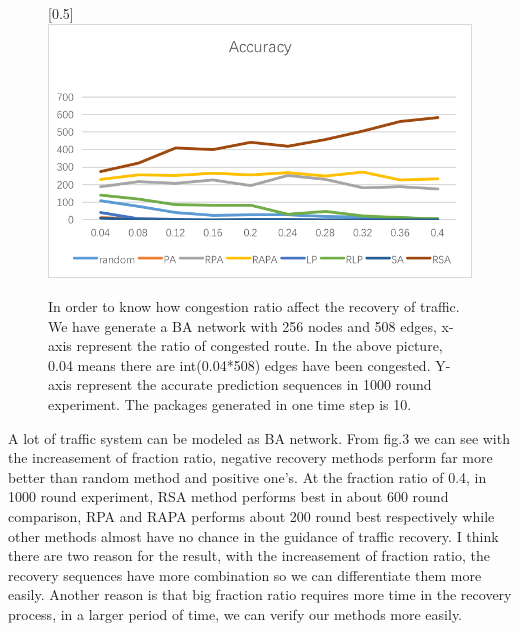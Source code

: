 \documentclass[onecolumn,preprintnumbers,amsmath,amssymb]{revtex4}
\begin{document}
\begin{figure}[ht]
\scalebox{0.5}[0.5]{\includegraphics[trim=0 10 0 0]{fractionSize.png}}
\caption{In order to know how congestion  ratio affect the recovery of traffic. We have generate a BA network with 256 nodes and 508 edges, x-axis represent the ratio of congested route. In the above picture, 0.04 means there are int(0.04*508) edges have been congested. Y-axis represent the accurate prediction sequences in 1000 round experiment. The packages generated in one time step is 10.}\label{BAZD}
\end{figure}


A lot of traffic system can be modeled as BA network. From fig.3 we can see with the increasement of fraction ratio, negative recovery methods perform far more better than random method and positive one's. At the fraction ratio of 0.4, in 1000 round experiment, RSA method performs best in about 600 round comparison, RPA and RAPA performs about 200 round best respectively while other methods almost have no chance in the guidance of traffic recovery. I think there are two reason for the result, with the increasement of fraction ratio, the recovery sequences have  more combination so we can differentiate them more easily. Another reason is that big fraction ratio requires more time in the recovery process, in a larger period of time, we can verify our methods more easily. 
\end{document}
